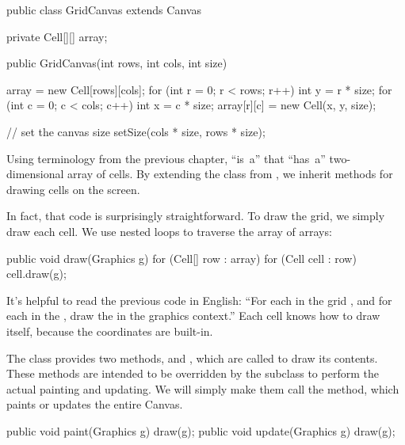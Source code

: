 \begin{code}
public class GridCanvas extends Canvas {
    private Cell[][] array;

    public GridCanvas(int rows, int cols, int size) {
        array = new Cell[rows][cols];
        for (int r = 0; r < rows; r++) {
            int y = r * size;
            for (int c = 0; c < cols; c++) {
                int x = c * size;
                array[r][c] = new Cell(x, y, size);
            }
        }

        // set the canvas size
        setSize(cols * size, rows * size);
    }
}
\end{code}


Using terminology from the previous chapter,  ``is~a''  that ``has~a'' two-dimensional array of cells.
By extending the  class from , we inherit methods for drawing cells on the screen.

In fact, that code is surprisingly straightforward.
To draw the grid, we simply draw each cell.
We use nested  loops to traverse the array of arrays:

\begin{code}
public void draw(Graphics g) {
    for (Cell[] row : array) {
        for (Cell cell : row) {
            cell.draw(g);
        }
    }
}
\end{code}

It's helpful to read the previous code in English: ``For each  in the grid , and for each  in the , draw the  in the graphics context.''
Each cell knows how to draw itself, because the coordinates are built-in.

The  class provides two methods,  and , which are called to draw its contents.
These methods are intended to be overridden by the subclass to perform the actual painting and updating.
We will simply make them call the  method, which paints or updates the entire Canvas.


\begin{code}
public void paint(Graphics g) {
    draw(g);
}
public void update(Graphics g) {
    draw(g);
}
\end{code}

